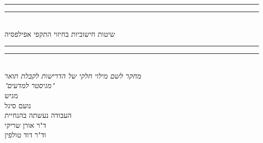 \documentclass[12pt,a4paper,\pagelayoutformat,onecolumn]{book}
\def\thesisTitle{שיטות חישוביות בחיזוי התקפי אפילפסיה}
\def\thesisAuthor{נועם סיגל}
\begin{document}

\begin{center}
\vspace*{2mm}
\rule[0.5ex]{\linewidth}{2pt}\vspace*{-\baselineskip}\vspace*{3.2pt}
\rule[0.5ex]{\linewidth}{1pt}\\
[\baselineskip]{\Huge \thesisTitle}\\[3mm]
\rule[0.5ex]{\linewidth}{1pt}\vspace*{-\baselineskip}\vspace{3.2pt}
\rule[0.5ex]{\linewidth}{2pt}\\
[9mm]
{\large \textit{מחקר לשם מילוי חלקי של הדרישות לקבלת תואר\\ 
"מגיסטר למדעים"
}}\\ [2mm]
\vspace{8mm}
{\large מגיש}\\
\vspace{2.5mm}
{\large\textsc{\thesisAuthor}}\\
\vspace{10mm}
{\large העבודה נעשתה בהנחיית}\\
\vspace{2.5mm}
{\large\textsc{ד"ר אורן שריקי}}\\
\vspace{2.5mm}
{\large\textsc{וד"ר דוד טולפין}}\\
\vspace{8mm}


\end{center}
\end{document}
